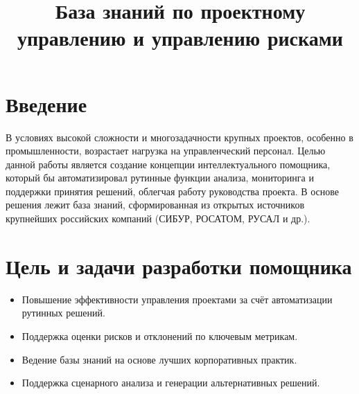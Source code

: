 \documentclass[12pt]{article}
\title{База знаний по проектному управлению и управлению рисками}
\author{}
\date{}
\begin{document}
\maketitle

\section*{Введение}
В условиях высокой сложности и многозадачности крупных проектов, особенно в промышленности, возрастает нагрузка на управленческий персонал. Целью данной работы является создание концепции интеллектуального помощника, который бы автоматизировал рутинные функции анализа, мониторинга и поддержки принятия решений, облегчая работу руководства проекта. В основе решения лежит база знаний, сформированная из открытых источников крупнейших российских компаний (СИБУР, РОСАТОМ, РУСАЛ и др.).

\section{Цель и задачи разработки помощника}
\begin{itemize}
    \item Повышение эффективности управления проектами за счёт автоматизации рутинных решений.
    \item Поддержка оценки рисков и отклонений по ключевым метрикам.
    \item Ведение базы знаний на основе лучших корпоративных практик.
    \item Поддержка сценарного анализа и генерации альтернативных решений.
\end{itemize}
\end{document}
